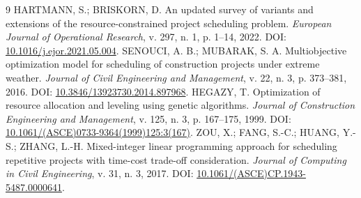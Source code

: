 \documentclass[12pt,a4paper]{article}
\begin{document}
\begin{thebibliography}{9}
 HARTMANN, S.; BRISKORN, D. An updated survey of variants and extensions of the resource-constrained project scheduling problem. \textit{European Journal of Operational Research}, v. 297, n. 1, p. 1--14, 2022. DOI: \href{https://doi.org/10.1016/j.ejor.2021.05.004}{10.1016/j.ejor.2021.05.004}.
 SENOUCI, A. B.; MUBARAK, S. A. Multiobjective optimization model for scheduling of construction projects under extreme weather. \textit{Journal of Civil Engineering and Management}, v. 22, n. 3, p. 373--381, 2016. DOI: \href{https://doi.org/10.3846/13923730.2014.897968}{10.3846/13923730.2014.897968}.
 HEGAZY, T. Optimization of resource allocation and leveling using genetic algorithms. \textit{Journal of Construction Engineering and Management}, v. 125, n. 3, p. 167--175, 1999. DOI: \href{https://doi.org/10.1061/(ASCE)0733-9364(1999)125:3(167)}{10.1061/(ASCE)0733-9364(1999)125:3(167)}.
 ZOU, X.; FANG, S.-C.; HUANG, Y.-S.; ZHANG, L.-H. Mixed-integer linear programming approach for scheduling repetitive projects with time-cost trade-off consideration. \textit{Journal of Computing in Civil Engineering}, v. 31, n. 3, 2017. DOI: \href{https://doi.org/10.1061/(ASCE)CP.1943-5487.0000641}{10.1061/(ASCE)CP.1943-5487.0000641}.
\end{thebibliography}
\end{document}
